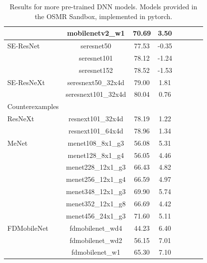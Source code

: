 {\begin{table}[!htb]
\begin{center}
\begin{tabular}{|p{1in}|c|c|c|c|c|c|c|}
& mobilenetv2\_w1 & 70.69 & 3.50 \\
\hline
SE-ResNet
& seresnet50 & 77.53 & -0.35 \\
& seresnet101 & 78.12 & -1.24 \\
& seresnet152 & 78.52 & -1.53 \\
\hline
SE-ResNeXt
& seresnext50\_32x4d & 79.00 & 1.81 \\
& seresnext101\_32x4d & 80.04 & 0.76 \\
\hline
Counterexamples & & &  \\
\hline
ResNeXt
& resnext101\_32x4d & 78.19 & 1.22 \\
& resnext101\_64x4d & 78.96 & 1.34 \\
\hline
MeNet
& menet108\_8x1\_g3 & 56.08 & 5.31 \\
& menet128\_8x1\_g4 & 56.05 & 4.46 \\
& menet228\_12x1\_g3 & 66.43 & 4.82 \\
& menet256\_12x1\_g4 & 66.59 & 4.97 \\
& menet348\_12x1\_g3 & 69.90 & 5.74 \\
& menet352\_12x1\_g8 & 66.69 & 4.42 \\
& menet456\_24x1\_g3 & 71.60 & 5.11 \\
\hline
FDMobileNet
& fdmobilenet\_wd4 & 44.23 & 6.40 \\
& fdmobilenet\_wd2 & 56.15 & 7.01 \\
& fdmobilenet\_w1 & 65.30 & 7.10 \\
\hline
\end{tabular}
\end{center}
\caption{Results for more pre-trained DNN models.  Models provided in the OSMR Sandbox, implemented in pytorch.}
\label{table:models_more}
\end{table}


}
